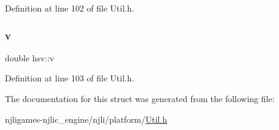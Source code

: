 Definition at line 102 of file Util.\+h.

\mbox{\label{structhsv_a572c01d23590231adffe6f9b16df20d3}} 
\subsubsection{\texorpdfstring{v}{v}}
{\footnotesize\ttfamily double hsv\+::v}



Definition at line 103 of file Util.\+h.



The documentation for this struct was generated from the following file\+:\begin{DoxyCompactItemize}
\item 
njligames-\/njlic\+\_\+engine/njli/platform/\mbox{\hyperlink{_util_8h}{Util.\+h}}\end{DoxyCompactItemize}

